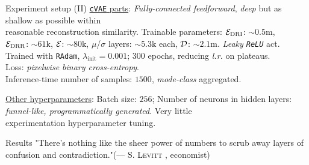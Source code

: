 {\begin{frame}{ Experiment setup (II)}
        \underline{\texttt{cVAE} parts}: \textit{Fully-connected feedforward}, \textit{deep} but as shallow as possible within\\reasonable reconstruction similarity. Trainable parameters: $\mathcal{E}_{\text{DRI}}$: $\sim0.5\text{m}$,\\\alert{$\mathcal{E}_{\text{DRR}}$: $\sim61\text{k}$}, $\mathcal{E}$: $\sim80\text{k}$, $\mu$/$\sigma$ layers: $\sim5.3\text{k}$ each, \alert{$\mathcal{D}$: $\sim2.1\text{m}$}. \textit{Leaky \texttt{ReLU}} act.\\Trained with \texttt{RAdam}, $\lambda_{\text{init}}=0.001$; $300$ epochs, reducing \textit{l.r.} on plateaus.\\Loss: \textit{pixelwise binary cross-entropy}.\\Inference-time number of samples: $1500$, \textit{mode-class} aggregated.

        \hfill\break

        \underline{Other hyperparameters}: Batch size: $256$; Number of neurons in hidden layers:\\\hphantom{Other hyperparameters: }\textit{funnel-like, programmatically generated}. Very little\\\hphantom{Other hyperparameters: }experimentation \wrt hyperparameter tuning.

        \hfill\break
        \begin{center}
        \end{center}


    \end{frame}

    \begin{frame}{ Results}
        \vspace*{11px}
        "There's nothing like the sheer power of numbers to scrub away layers of confusion and contradiction."{\hfill}(--- \textsc{S. Levitt   }, economist)\hspace{0.75cm}
        \vspace*{8px}


\end{frame}}
